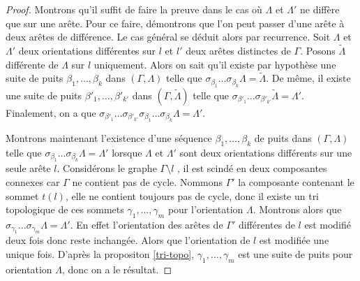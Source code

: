 \documentclass[a4paper,11pt]{article}
\begin{document}
\begin{proof}
  Montrons qu'il suffit de faire la preuve dans le cas où $\Lambda$ et $\Lambda'$ ne diffère que sur une arête. Pour ce faire, démontrons que l'on peut passer d'une arête à deux arêtes de différence. Le cas général se déduit alors par recurrence. 
Soit $\Lambda$ et $\Lambda'$ deux orientations différentes sur $l$ et $l'$ deux arêtes distinctes de $\Gamma$. Posons $\widetilde \Lambda$ différente de $\Lambda$ sur $l$ uniquement. Alors on sait qu'il existe par hypothèse une suite de puits $\beta_{1}, \dots, \beta_{k}$ dans $( \Gamma, \Lambda)$ telle que $\sigma_{\beta_{1}}\dots\sigma_{\beta_{k}}\Lambda = \widetilde \Lambda$. De même, il existe une suite de puits $\beta'_{1}, \dots, \beta'_{k'}$ dans $(\Gamma,\widetilde \Lambda)$ telle que $\sigma_{\beta'_{1}}\dots\sigma_{\beta'_{k'}} \widetilde \Lambda = \Lambda'$. Finalement, on a que $\sigma_{\beta'_{1}}\dots\sigma_{\beta'_{k'}}\sigma_{\beta_{1}}\dots\sigma_{\beta_{k}}\Lambda =  \Lambda'$. 

Montrons maintenant l'existence d'une séquence $\beta_{1}, \dots, \beta_{k}$ de puits dans $(\Gamma,\Lambda)$ telle que $\sigma_{\beta_{1}}\dots\sigma_{\beta_{k}}\Lambda = \Lambda'$ lorsque $\Lambda$ et $\Lambda'$ sont deux orientations différents sur une seule arête $l$. Considérons le graphe $\Gamma \setminus l $ , il est scindé en deux composantes connexes car $\Gamma$ ne contient pas de cycle. Nommons $\Gamma'$ la composante contenant le sommet $t(l)$, elle ne contient toujours pas de cycle, donc il existe un tri topologique de ces sommets $\gamma_{1}, \dots, \gamma_{m}$ pour l'orientation $\Lambda$. Montrons alors que $\sigma_{\gamma_{1}}\dots\sigma_{\gamma_{m}} \Lambda = \Lambda'$. En effet l'orientation des arêtes de $\Gamma'$ différentes de $l$ est modifié deux fois donc reste inchangée. Alors que l'orientation de $l$ est modifiée une unique fois. D'après la propositon \ref{tri-topo}, $\gamma_{1}, \dots, \gamma_{m}$ est une suite de puits pour orientation $\Lambda$, donc on a le résultat.


\end{proof}
\end{document}
